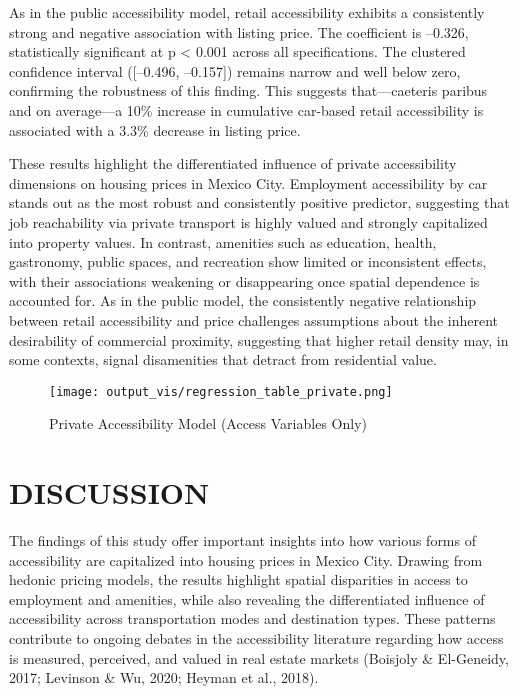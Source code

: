 \documentclass[
  12pt,
]{report}
\begin{document}
As in the public accessibility model, retail accessibility exhibits a
consistently strong and negative association with listing price. The
coefficient is --0.326, statistically significant at p \textless{} 0.001
across all specifications. The clustered confidence interval
({[}--0.496, --0.157{]}) remains narrow and well below zero, confirming
the robustness of this finding. This suggests that---caeteris paribus
and on average---a 10\% increase in cumulative car-based retail
accessibility is associated with a 3.3\% decrease in listing price.

These results highlight the differentiated influence of private
accessibility dimensions on housing prices in Mexico City. Employment
accessibility by car stands out as the most robust and consistently
positive predictor, suggesting that job reachability via private
transport is highly valued and strongly capitalized into property
values. In contrast, amenities such as education, health, gastronomy,
public spaces, and recreation show limited or inconsistent effects, with
their associations weakening or disappearing once spatial dependence is
accounted for. As in the public model, the consistently negative
relationship between retail accessibility and price challenges
assumptions about the inherent desirability of commercial proximity,
suggesting that higher retail density may, in some contexts, signal
disamenities that detract from residential value.

\begin{figure}[H]

{\centering \texttt{[image: output\_vis/regression\_table\_private.png]}

}

\caption{Private Accessibility Model (Access Variables Only)}

\end{figure}%

\newpage

\chapter{DISCUSSION}\label{discussion}

The findings of this study offer important insights into how various
forms of accessibility are capitalized into housing prices in Mexico
City. Drawing from hedonic pricing models, the results highlight spatial
disparities in access to employment and amenities, while also revealing
the differentiated influence of accessibility across transportation
modes and destination types. These patterns contribute to ongoing
debates in the accessibility literature regarding how access is
measured, perceived, and valued in real estate markets (Boisjoly \&
El-Geneidy, 2017; Levinson \& Wu, 2020; Heyman et al., 2018).
\end{document}
